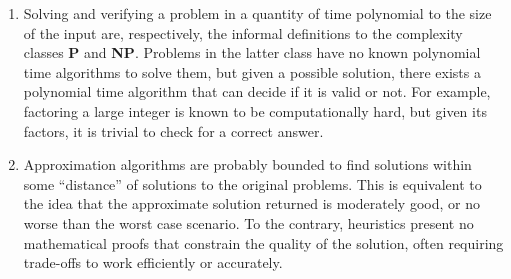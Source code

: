 \documentclass[12pt]{article}
\begin{document}
\begin{enumerate}
\begin{enumerate}
    \item Solving and verifying a problem in a quantity of time polynomial to the size of the input are, respectively, the informal definitions to the complexity classes \textbf{P} and \textbf{NP}. Problems in the latter class have no known polynomial time algorithms to solve them, but given a possible solution, there exists a polynomial time algorithm that can decide if it is valid or not. For example, factoring a large integer is known to be computationally hard, but given its factors, it is trivial to check for a correct answer.
    \item Approximation algorithms are probably bounded to find solutions within some ``distance'' of solutions to the original problems. This is equivalent to the idea that the approximate solution returned is moderately good, or no worse than the worst case scenario. To the contrary, heuristics present no mathematical proofs that constrain the quality of the solution, often requiring trade-offs to work efficiently or accurately.
  \end{enumerate}
\end{enumerate}
\end{document}
